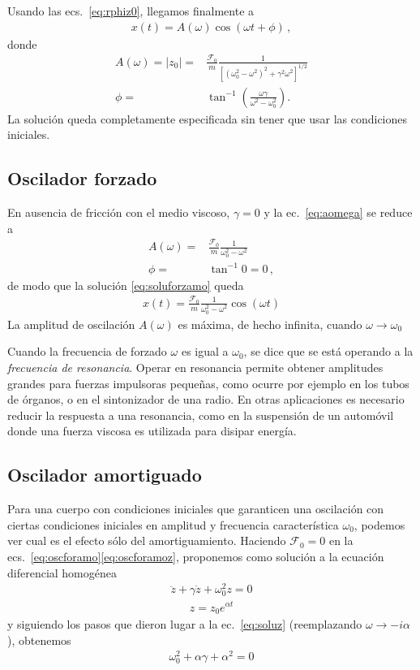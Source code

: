 Usando las ecs.~\eqref{eq:rphiz0}, llegamos finalmente a %
\begin{align}
  \label{eq:soluforzamo}
  x(t)=A(\omega)\cos(\omega t+\phi)\,,
\end{align}
donde
\begin{align}
  \label{eq:aomega}
  A(\omega)=|z_0|=&\frac{\mathcal{F}_0}{m}\frac{1}{\left[\left(\omega_0^2-\omega^2\right)^2+\gamma^2\omega^2\right]^{1/2}}\nonumber\\
  \phi=&\tan^{-1}\left(\frac{\omega\gamma}{\omega^2-\omega_0^2}\right).
\end{align}
La solución queda completamente especificada sin tener que usar las condiciones iniciales. %


\subsection{Oscilador forzado}
En ausencia de fricción con el medio viscoso, $\gamma=0$ y la ec.~\eqref{eq:aomega} se reduce a
\begin{align*}
  A(\omega)=&\frac{\mathcal{F}_0}{m}\frac{1}{\omega_0^2-\omega^2}\nonumber\\
  \phi=&\tan^{-1}0=0\,,
\end{align*}
de modo que la solución \eqref{eq:soluforzamo} queda 
\begin{align*}
  x(t)=\frac{\mathcal{F}_0}{m}\frac{1}{\omega_0^2-\omega^2}\cos(\omega t)
\end{align*}
La amplitud de oscilación $A(\omega)$ es máxima, de hecho infinita, cuando $\omega\to \omega_0$ %

Cuando la frecuencia de forzado $\omega$ es igual a $\omega_0$, se dice que se está operando a la \emph{frecuencia de resonancia}. Operar en resonancia permite obtener amplitudes grandes para fuerzas impulsoras pequeñas, como ocurre por ejemplo en los tubos de órganos, o en el sintonizador de una radio. En otras aplicaciones es necesario reducir la respuesta a una resonancia, como en la suspensión de un automóvil donde una fuerza viscosa es utilizada para disipar energía. 

\subsection{Oscilador amortiguado}
Para una cuerpo con condiciones iniciales que garanticen una oscilación con ciertas condiciones iniciales en amplitud y frecuencia característica $\omega_0$, podemos ver cual es el efecto sólo del amortiguamiento. Haciendo $\mathcal{F}_0=0$ en la ecs.~\eqref{eq:oscforamo}\eqref{eq:oscforamoz}, proponemos como solución a la ecuación diferencial homogénea
\begin{align*}
     \ddot z+\gamma \dot z+\omega_0^2 z=0
\end{align*}
\begin{align*}
  z=z_0 e^{\alpha t}
\end{align*}
y siguiendo los pasos que dieron lugar a la ec.~\eqref{eq:soluz} (reemplazando $\omega\to -i\alpha$), obtenemos
\begin{align*}
  \omega_0^2+\alpha \gamma+\alpha^2=0
\end{align*}

